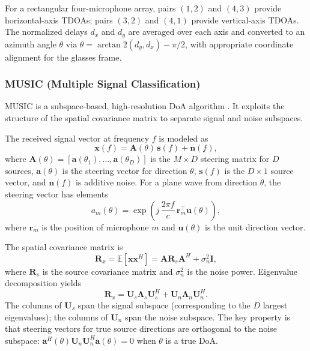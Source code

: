 \documentclass[12pt, titlepage]{article}
\begin{document}
For a rectangular four-microphone array, pairs $(1,2)$ and $(4,3)$ provide
horizontal-axis TDOAs; pairs $(3,2)$ and $(4,1)$ provide vertical-axis TDOAs.
The normalized delays $d_x$ and $d_y$ are averaged over each axis and converted
to an azimuth angle $\theta$ via $\theta = \arctan2(d_y, d_x) - \pi/2$, with
appropriate coordinate alignment for the glasses frame.

\subsubsection{MUSIC (Multiple Signal Classification)} \label{sec:music}

MUSIC is a subspace-based, high-resolution DoA algorithm \cite{Schmidt1986}. It
exploits the structure of the spatial covariance matrix to separate signal and
noise subspaces.

The received signal vector at frequency $f$ is modeled as
\begin{equation}
  \mathbf{x}(f) = \mathbf{A}(\theta) \, \mathbf{s}(f) + \mathbf{n}(f),
\end{equation}
where $\mathbf{A}(\theta) = [\mathbf{a}(\theta_1), \ldots, \mathbf{a}(\theta_D)]$
is the $M \times D$ steering matrix for $D$ sources, $\mathbf{a}(\theta)$ is
the steering vector for direction $\theta$, $\mathbf{s}(f)$ is the $D \times 1$
source vector, and $\mathbf{n}(f)$ is additive noise. For a plane wave from
direction $\theta$, the steering vector has elements
\begin{equation}
  a_m(\theta) = \exp\left( j \, \frac{2\pi f}{c} \, \mathbf{r}_m^\top
  \mathbf{u}(\theta) \right),
\end{equation}
where $\mathbf{r}_m$ is the position of microphone $m$ and $\mathbf{u}(\theta)$
is the unit direction vector.

The spatial covariance matrix is
\begin{equation}
  \mathbf{R}_x = \mathbb{E}\left[ \mathbf{x} \mathbf{x}^H \right] =
  \mathbf{A} \mathbf{R}_s \mathbf{A}^H + \sigma_n^2 \mathbf{I},
\end{equation}
where $\mathbf{R}_s$ is the source covariance matrix and $\sigma_n^2$ is the
noise power. Eigenvalue decomposition yields
\begin{equation}
  \mathbf{R}_x = \mathbf{U}_s \boldsymbol{\Lambda}_s \mathbf{U}_s^H +
  \mathbf{U}_n \boldsymbol{\Lambda}_n \mathbf{U}_n^H.
\end{equation}
The columns of $\mathbf{U}_s$ span the signal subspace (corresponding to the
$D$ largest eigenvalues); the columns of $\mathbf{U}_n$ span the noise
subspace. The key property is that steering vectors for true source directions
are orthogonal to the noise subspace: $\mathbf{a}^H(\theta) \mathbf{U}_n
\mathbf{U}_n^H \mathbf{a}(\theta) = 0$ when $\theta$ is a true DoA.
\end{document}
